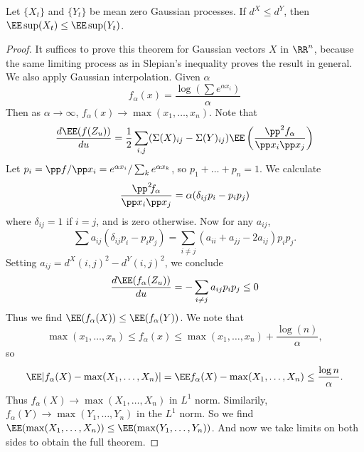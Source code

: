 \begin{theorem}
    Let $\{ X_t \}$ and $\{ Y_t \}$ be mean zero Gaussian processes. If $d^X \leq d^Y$, then $\EE \sup(X_t) \leq \EE \sup(Y_t)$.
\end{theorem}
\begin{proof}
    It suffices to prove this theorem for Gaussian vectors $X$ in $\RR^n$, because the same limiting process as in Slepian's inequality proves the result in general. We also apply Gaussian interpolation. Given $\alpha$
    \[ f_\alpha(x) = \frac{\log \left( \sum e^{\alpha x_i} \right)}{\alpha} \]
    Then as $\alpha \to \infty$, $f_\alpha(x) \to \max(x_1, \dots, x_n)$. Note that
    \[ \frac{d \EE(f(Z_u))}{du} = \frac{1}{2} \sum_{i,j} (\Sigma(X)_{ij} - \Sigma(Y)_{ij}) \EE \left( \frac{\pp^2 f_\alpha}{\pp x_i \pp x_j} \right) \]
    Let $p_i = \pp f / \pp x_i = e^{\alpha x_i} / \sum_k e^{\alpha x_k}$, so $p_1 + \dots + p_n = 1$. We calculate
    \[ \frac{\pp^2 \hspace{-0.2em} f_\alpha}{\pp x_i \pp x_j} = \alpha(\delta_{ij} p_i - p_i p_j) \]
    where $\delta_{ij} = 1$ if $i = j$, and is zero otherwise. Now for any $a_{ij}$,
    \[ \sum a_{ij}(\delta_{ij} p_i - p_i p_j) = \sum_{i \neq j} (a_{ii} + a_{jj} - 2 a_{ij}) p_i p_j. \]
    Setting $a_{ij} = d^X(i,j)^2 - d^Y(i,j)^2$, we conclude
    \[ \frac{d \EE(f_\alpha(Z_u))}{du} = - \sum_{i \neq j} a_{ij} p_i p_j \leq 0 \]
    Thus we find $\EE(f_\alpha(X)) \leq \EE(f_\alpha(Y))$. We note that
    \[ \max(x_1, \dots, x_n) \leq f_\alpha(x) \leq \max(x_1, \dots, x_n) + \frac{\log(n)}{\alpha}, \]
    so
    \[ \EE |f_\alpha(X) - \max(X_1, \dots, X_n)|  = \EE f_\alpha(X) - \max(X_1, \dots, X_n) \leq \frac{\log n}{\alpha}. \]
    Thus $f_\alpha(X) \to \max(X_1, \dots, X_n)$ in $L^1$ norm. Similarily, $f_\alpha(Y) \to \max(Y_1, \dots, Y_n)$ in the $L^1$ norm. So we find $\EE(\max(X_1, \dots, X_n)) \leq \EE(\max(Y_1, \dots, Y_n))$. And now we take limits on both sides to obtain the full theorem.
\end{proof}






